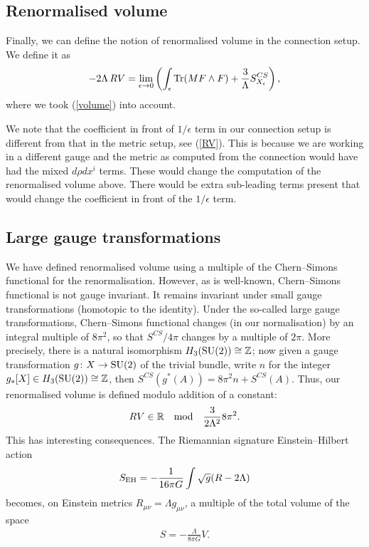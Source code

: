 \documentclass[a4paper,12pt]{article}
\newcommand{\Z}{{\mathbb Z}}
\newcommand{\be}{\begin{eqnarray}}
\newcommand{\ee}{\end{eqnarray}}
\begin{document}
\subsection{Renormalised volume}

Finally, we can define the notion of renormalised volume in the connection setup. We define it as
\be\label{RV-CS}
-2 \Lambda \, RV= \lim_{\epsilon\to 0} \left( \int_\epsilon {\rm Tr}(M F\wedge F) + \frac{3}{\Lambda} S^{CS}_{X_\epsilon} \right),
\ee
where we took (\ref{volume}) into account. 

We note that the coefficient in front of $1/\epsilon$ term in our connection setup is different from that in the metric setup, see (\ref{RV}). This is because we are working in a different gauge and the metric as computed from the connection would have had the mixed $d\rho dx^i$ terms. These would change the computation of the renormalised volume above. There would be extra sub-leading terms present that would change the coefficient in front of the $1/\epsilon$ term. 

\subsection{Large gauge transformations}

We have defined renormalised volume using a multiple of the Chern--Simons functional for the renormalisation. However, as is well-known, Chern--Simons functional is not gauge invariant. It remains invariant under small gauge transformations (homotopic to the identity). Under the so-called large gauge transformations, Chern--Simons functional changes (in our normalisation) by an integral multiple of $8\pi^2$, so that $S^{CS}/4\pi$ changes by a multiple of $2\pi$. More precisely, there is a natural isomorphism $H_3(\rm{SU}(2)) \cong \mathbb{Z}$; now given a gauge transformation $g \colon X \to \rm{SU}(2)$ of the trivial bundle, write $n$ for the integer $g_*[X] \in H_3(\rm{SU}(2)) \cong \Z$, then $S^{CS}(g^*(A)) = 8\pi^2 n + S^{CS}(A)$. Thus, our renormalised volume is defined modulo addition of a constant:
\be
RV\in \mathbb{R}\quad {\rm mod} \quad \frac{3}{2\Lambda^2} 8\pi^2. 
\ee
This has interesting consequences. The Riemannian signature Einstein--Hilbert action
\be
S_{\rm EH} = -\frac{1}{16\pi G} \int \sqrt{g} (R-2\Lambda)
\ee
becomes, on Einstein metrics $R_{\mu\nu}=\Lambda g_{\mu\nu}$, a multiple of the total volume of the space
\be\label{S-EH-on-shell}
S = -\frac{\Lambda}{8\pi G} V.
\ee
\end{document}
